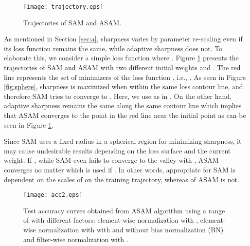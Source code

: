 \documentclass{article}
\begin{document}
\begin{figure}
\centering
\captionsetup{justification=centering}
\texttt{[image: trajectory.eps]}
\caption{Trajectories of SAM and ASAM.}\label{contour}
\end{figure}

As mentioned in Section \ref{sec:a}, sharpness varies by parameter re-scaling even if its loss function remains the same, while adaptive sharpness does not.
To elaborate this, we consider a simple loss function  where .
Figure \ref{contour} presents the trajectories of SAM and ASAM with two different initial weights  and .
The red line represents the set of minimizers of the loss function , i.e., .
As seen in Figure \ref{fig:sphere}, sharpness is maximized when  within the same loss contour line, and therefore SAM tries to converge to .
Here, we use  as in \citet{foret2021sharpnessaware}.
On the other hand, adaptive sharpness remains the same along the same contour line which implies that ASAM converges to the point in the red line near the initial point as can be seen in Figure \ref{contour}.

Since SAM uses a fixed radius in a spherical region for minimizing sharpness, it may cause undesirable results depending on the loss surface and the current weight.
If , while SAM even fails to converge to the valley with , ASAM converges no matter which  is used if . In other words, appropriate  for SAM is dependent on the scales of  on the training trajectory, whereas  of ASAM is not.

\begin{figure}[!t]
\begin{center}
\centerline{\texttt{[image: acc2.eps]}}
\caption{
Test accuracy curves obtained from ASAM algorithm using a range of  with different factors: element-wise normalization with , element-wise normalization with  with and without bias normalization (BN) and filter-wise normalization with .
}
\label{normalization}
\end{center}
\end{figure}
\end{document}
